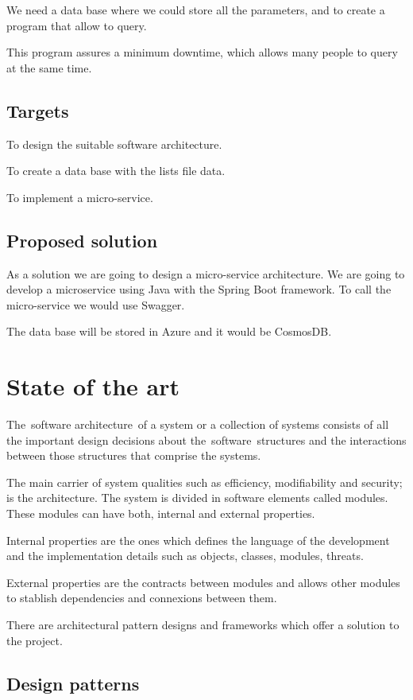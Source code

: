 \documentclass[12pt]{report} %
\begin{document}
We need a data base where we could store all the parameters, and to create a program that allow to query.

This program assures a minimum downtime, which allows many people to query at the same time.

\subsection{Targets}

To design the suitable software architecture.

To create a data base with the lists file data.

To implement a micro-service.


\subsection{Proposed solution}
As a solution we are going to design a micro-service architecture. We are going to develop a microservice using Java with the Spring Boot framework. To call the micro-service we would use Swagger. 

The data base will be stored in Azure and it would be CosmosDB.
\section{State of the art}

The software architecture of a system or a collection of systems consists of all the important design decisions about the software structures and the interactions between those structures that comprise the systems.

The main carrier of system qualities such as efficiency, modifiability and security; is the architecture. The system is divided in software elements called modules. These modules can have both, internal and external properties. 

Internal properties are the ones which defines the language of the development and the implementation details such as objects, classes, modules, threats.

External properties are the contracts between modules and allows other modules to stablish dependencies and connexions between them. 

There are architectural pattern designs and frameworks which offer a solution to the project.

\subsection{Design patterns}
\end{document}
